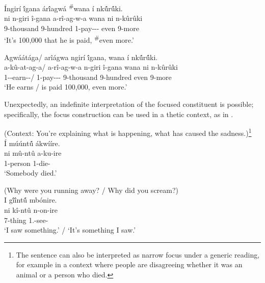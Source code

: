 \documentclass[output=paper]{langscibook}
\begin{document}
\ea
\label{bkm:Ref111981473}
\ea
\label{bkm:Ref111981473:a}
\'{I}ngirí \'{î}gana ár\'{î}agwá \textsuperscript{\#}wana í nk\'{û}r\'{û}ki.\\
\gll
ni  n-giri  î-gana  a-rî-ag-w-a  wana  ni  n-kûrûki\\
\FOC{} 9-thousand  9-hundred 1\SM{}-pay-\HAB-\PASS-\FV{} even \FOC{}  9-more\\
\glt
‘It’s 100,000 that he is paid, \textsuperscript{\#}even more.’

\ex
\label{bkm:Ref111981473:b}
Agwáátága/ arîágwa ngirí {\'{î}gana}, wana í {nk\'{û}r\'{û}ki}.\\
\gll
a-kû-at-ag-a/  a-rî-ag-w-a  n-giri  î-gana  wana  ni  n-kûrûki\\
1\SM-\PRS{}-earn-\HAB-\FV{}/  1\SM{}-pay-\HAB-\PASS{}-\FV{} 9-thousand  9-hundred even \FOC{} 9-more\\
\glt
‘He earns / is paid 100,000, even more.’

\z
\z

Unexpectedly, an indefinite interpretation of the focused constituent is possible; specifically, the focus construction can be used in a thetic context, as in .\largerpage[-1]\pagebreak

\ea
\label{bkm:Ref111803119}
(Context: You’re explaining what is happening, what has caused the sadness.)\footnote{The sentence can also be interpreted as narrow focus under a generic reading, for example in a context where people are disagreeing whether it was an animal or a person who died.}\\
Í múúnt\'{û} ákwííre.\\
\gll
ni  mû-ntû  a-ku-ire\\
\FOC{} 1-person 1\SM{}-die-\PFV{}\\
\glt
‘Somebody died.’

\z

\ea
(Why were you running away? / Why did you scream?)\\
I g\'{î}\'{î}nt\'{û} mbónire.\\
\gll
ni  kî-ntû  n-on-ire\\
\FOC{} 7-thing 1\SG.\SM{}-see-\PFV{}\\
\glt
‘I saw something.’ / ‘It’s something I saw.’
\end{document}
